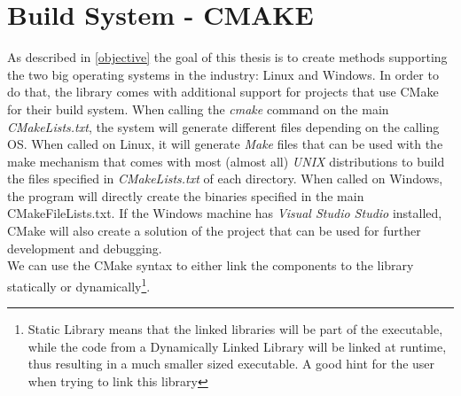 \section{Build System - CMAKE}
As described in \ref{objective} the goal of this thesis is to create methods supporting the two big operating systems in the industry: Linux and Windows. In order to do that, the library comes with additional support for projects that use CMake for their build system. When calling the \textit{cmake} command on the main \textit{CMakeLists.txt}, the system will generate different files depending on the calling OS. When called on Linux, it will generate \textit{Make} files that can be used with the make mechanism that comes with most (almost all) \textit{UNIX} distributions to build the files specified in \textit{CMakeLists.txt} of each directory. When called on Windows, the program will directly create the binaries specified in the main CMakeFileLists.txt. If the Windows machine has \textit{Visual Studio Studio} installed, CMake will also create a solution of the project that can be used for further development and debugging.\\
We can use the CMake syntax to either link the components to the library statically or dynamically\footnote{Static Library means that the linked libraries will be part of the executable, while the code from a Dynamically Linked Library will be linked at runtime, thus resulting in a much smaller sized executable. A good hint for the user when trying to link this library}. 
